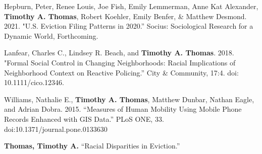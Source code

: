 

\begin{cvparagraph}

Hepburn, Peter, Renee Louis, Joe Fish, Emily Lemmerman, Anne Kat Alexander,  \textbf{Timothy A. Thomas}, Robert Koehler, Emily Benfer, \& Matthew Desmond. 2021. "U.S. Eviction Filing Patterns in 2020.” Socius: Sociological Research for a Dynamic World, Forthcoming.
\end{cvparagraph}

\begin{cvparagraph}

Lanfear, Charles C., Lindsey R. Beach, and \textbf{Timothy A. Thomas}. 2018. "Formal Social Control in Changing Neighborhoods: Racial Implications of Neighborhood Context on Reactive Policing.” City \& Community, 17:4. doi: 10.1111/cico.12346.
\end{cvparagraph}

\begin{cvparagraph}

Williams, Nathalie E., \textbf{Timothy A. Thomas}, Matthew Dunbar, Nathan Eagle, and Adrian Dobra. 2015. “Measures of Human Mobility Using Mobile Phone Records Enhanced
with GIS Data.” PLoS ONE, 33. doi:10.1371/journal.pone.0133630
\end{cvparagraph}


\begin{cvparagraph}

\textbf{Thomas, Timothy A.} “Racial Disparities in Eviction.”
\end{cvparagraph}

